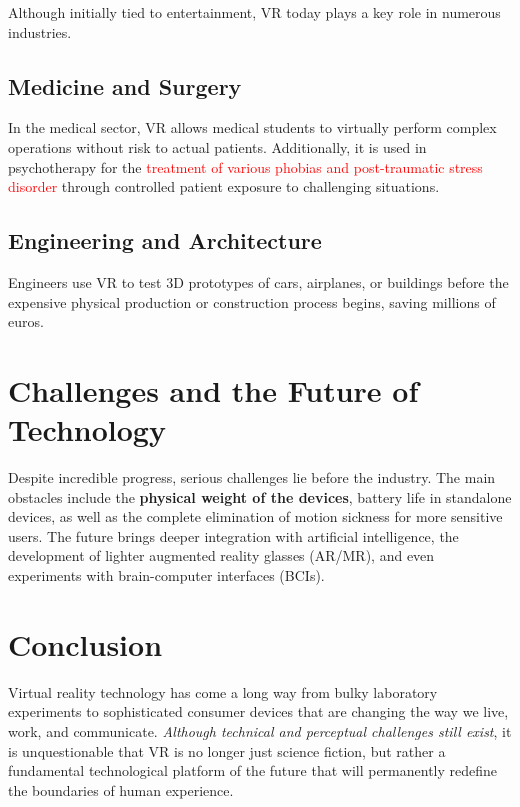 \documentclass[12pt,a4paper]{article}
\begin{document}
Although initially tied to entertainment, VR today plays a key role in numerous industries.

\subsection{Medicine and Surgery}
In the medical sector, VR allows medical students to virtually perform complex operations without risk to actual patients. Additionally, it is used in psychotherapy for the \textcolor{red}{treatment of various phobias and post-traumatic stress disorder} through controlled patient exposure to challenging situations.

\subsection{Engineering and Architecture}
Engineers use VR to test 3D prototypes of cars, airplanes, or buildings before the expensive physical production or construction process begins, saving millions of euros.

\section{Challenges and the Future of Technology}

Despite incredible progress, serious challenges lie before the industry. The main obstacles include the \textbf{physical weight of the devices}, battery life in standalone devices, as well as the complete elimination of motion sickness for more sensitive users. The future brings deeper integration with artificial intelligence, the development of lighter augmented reality glasses (AR/MR), and even experiments with brain-computer interfaces (BCIs).

\section{Conclusion}

Virtual reality technology has come a long way from bulky laboratory experiments to sophisticated consumer devices that are changing the way we live, work, and communicate. \textit{Although technical and perceptual challenges still exist}, it is unquestionable that VR is no longer just science fiction, but rather a fundamental technological platform of the future that will permanently redefine the boundaries of human experience.
\end{document}

